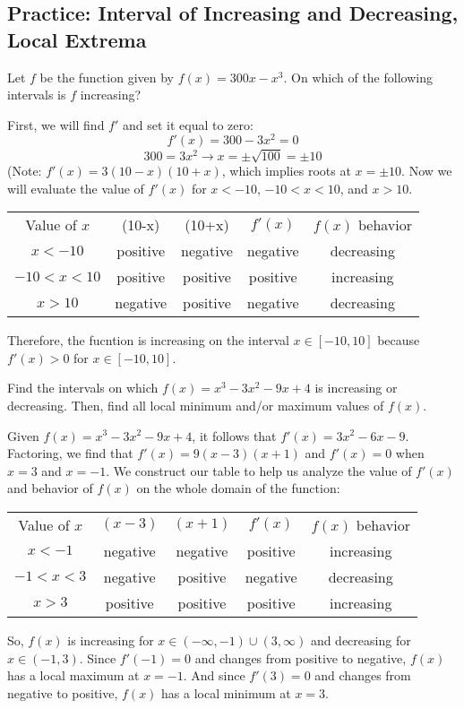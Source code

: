 \subsection{Practice: Interval of Increasing and Decreasing, Local Extrema}
\begin{Exercise}
    [label=incdec1]
    Let $f$ be the function given by $f(x) = 300x-x^3$. On which of the following intervals is $f$ increasing?
\end{Exercise}
\begin{Answer}
    [ref=incdec1]
    First, we will find $f'$ and set it equal to zero: $$f'(x)=300-3x^2=0$$ $$300=3x^2 \rightarrow x=\pm \sqrt{100} = \pm10$$ (Note: $f'(x) = 3(10-x)(10+x)$, which implies roots at $x=\pm10$. Now we will evaluate the value of $f'(x)$ for $x<-10$, $-10<x<10$, and $x>10$. 
    \begin{center}
        \begin{tabular}{c|c|c|c|c}
        Value of $x$ & (10-x) & (10+x) & $f'(x)$ & $f(x)$ behavior\\
         $x<-10$    &  positive & negative& negative & decreasing\\
         $-10<x<10$    & positive & positive& positive& increasing\\
         $x>10$ & negative & positive & negative & decreasing
        \end{tabular}
    \end{center}
    Therefore, the fucntion is increasing on the interval $x \in [-10, 10]$ because $f'(x) >0$ for $x \in [-10, 10]$.
\end{Answer}

\begin{Exercise}[label=locext1]
Find the intervals on which $f(x)=x^3-3x^2-9x+4$ is increasing or decreasing. Then, find all local minimum and/or maximum values of $f(x)$. 
\end{Exercise}

\begin{Answer}[ref=locext1]
Given $f(x)=x^3-3x^2-9x+4$, it follows that $f'(x)=3x^2-6x-9$. Factoring, we find that $f'(x) = 9(x-3)(x+1)$ and $f'(x) = 0$ when $x=3$ and $x=-1$. We construct our table to help us analyze the value of $f'(x)$ and behavior of $f(x)$ on the whole domain of the function:
\begin{center}
\begin{tabular}{c|c|c|c|c}
	Value of $x$ & $(x-3)$ & $(x+1)$ & $f'(x)$ & $f(x)$ behavior\\
	$x<-1$ & negative & negative & positive & increasing\\
	$-1<x<3$ & negative & positive & negative & decreasing\\
	$x>3$ & positive & positive & positive & increasing
\end{tabular}
\end{center}
So, $f(x)$ is increasing for $x \in (-\infty, -1) \cup (3, \infty)$ and decreasing for $x \in (-1, 3)$. Since $f'(-1)=0$ and changes from positive to negative, $f(x)$ has a local maximum at $x=-1$. And since $f'(3)=0$ and changes from negative to positive, $f(x)$ has a local minimum at $x=3$.
\end{Answer}

